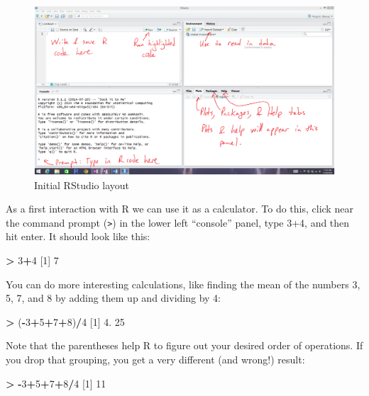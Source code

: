 \documentclass[]{book}
\newenvironment{Shaded}{\begin{snugshade}}{\end{snugshade}}
\newcommand{\DecValTok}[1]{\textcolor[rgb]{0.00,0.00,0.81}{#1}}
\newcommand{\StringTok}[1]{\textcolor[rgb]{0.31,0.60,0.02}{#1}}
\newcommand{\OperatorTok}[1]{\textcolor[rgb]{0.81,0.36,0.00}{\textbf{#1}}}
\newcommand{\NormalTok}[1]{#1}
\begin{document}
\begin{figure}
\includegraphics[width=14.72in]{chapter0_files/image003} \caption{Initial RStudio layout}\label{fig:Figure2}
\end{figure}

As a first interaction with R we can use it as a calculator. To do this,
click near the command prompt (\texttt{\textgreater{}}) in the lower
left ``console'' panel, type 3+4, and then hit enter. It should look
like this:

\begin{Shaded}
\begin{Highlighting}[]
\OperatorTok{>}\StringTok{ }\DecValTok{3}\OperatorTok{+}\DecValTok{4}
\NormalTok{[}\DecValTok{1}\NormalTok{] }\DecValTok{7}
\end{Highlighting}
\end{Shaded}

You can do more interesting calculations, like finding the mean of the
numbers 3, 5, 7, and 8 by adding them up and dividing by 4:

\begin{Shaded}
\begin{Highlighting}[]
\OperatorTok{>}\StringTok{ }\NormalTok{(}\OperatorTok{-}\DecValTok{3}\OperatorTok{+}\DecValTok{5}\OperatorTok{+}\DecValTok{7}\OperatorTok{+}\DecValTok{8}\NormalTok{)}\OperatorTok{/}\DecValTok{4}
\NormalTok{[}\DecValTok{1}\NormalTok{] }\DecValTok{4}\NormalTok{. }\DecValTok{25}
\end{Highlighting}
\end{Shaded}

Note that the parentheses help R to figure out your desired order of
operations. If you drop that grouping, you get a very different (and
wrong!) result:

\begin{Shaded}
\begin{Highlighting}[]
\OperatorTok{>}\StringTok{ }\OperatorTok{-}\DecValTok{3}\OperatorTok{+}\DecValTok{5}\OperatorTok{+}\DecValTok{7}\OperatorTok{+}\DecValTok{8}\OperatorTok{/}\DecValTok{4}
\NormalTok{[}\DecValTok{1}\NormalTok{] }\DecValTok{11}
\end{Highlighting}
\end{Shaded}
\end{document}
